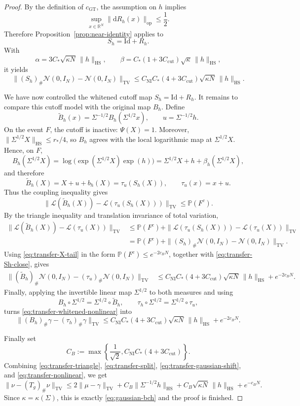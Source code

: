 \documentclass[10pt,a4paper]{amsart}
\newcommand{\HS}{\mathrm{HS}}
\newcommand{\Id}{\mathrm{Id}}
\newcommand{\Law}{\mathcal{L}}
\newcommand{\Prob}{\mathbb{P}}
\newcommand{\R}{\mathbb{R}}
\newcommand{\TV}{\mathrm{TV}}
\newcommand{\dd}{\mathrm{d}}
\newcommand{\op}{\mathrm{op}}
\begin{document}
\begin{proof}
By the definition of \(c_{\mathrm{GT}}\), the assumption on \(h\) implies
\[
\sup_{x\in\R^N}\|\dd R_h(x)\|_{\op}\le \frac12.
\]
Therefore Proposition~\ref{prop:near-identity} applies to
\[
S_h=\Id+R_h.
\]
With
\[
\alpha=3C_\ast\sqrt{\kappa N}\,\|h\|_{\HS},
\qquad
\beta=C_\ast(1+3C_{\mathrm{cut}})\sqrt{\kappa}\,\|h\|_{\HS},
\]
it yields
\begin{equation}
\label{eq:transfer-Sh-close}
\|(S_h)_\#\mathcal N(0,I_N)-\mathcal N(0,I_N)\|_{\TV}
\le
C_{\mathrm{NI}}C_\ast(4+3C_{\mathrm{cut}})
\sqrt{\kappa N}\,\|h\|_{\HS}.
\end{equation}


We have now controlled the whitened cutoff map \(S_h=\Id+R_h\). It remains to
compare this cutoff model with the original map \(B_h\). Define
\[
\widetilde B_h(x)=\Sigma^{-1/2}B_h(\Sigma^{1/2}x),
\qquad
u=\Sigma^{-1/2}h.
\]
On the event \(F\), the cutoff is inactive: \(\Psi(X)=1\). Moreover,
\(\|\Sigma^{1/2}X\|_{\HS}\le r_\ast/4\), so \(B_h\) agrees with the local
logarithmic map at \(\Sigma^{1/2}X\). Hence, on \(F\),
\[
B_h(\Sigma^{1/2}X)
=
\log\!\bigl(\exp(\Sigma^{1/2}X)\exp(h)\bigr)
=
\Sigma^{1/2}X+h+\beta_h(\Sigma^{1/2}X),
\]
and therefore
\[
\widetilde B_h(X)
=
X+u+b_h(X)
=
\tau_u(S_h(X)),
\qquad
\tau_u(x)=x+u.
\]
Thus the coupling inequality gives
\[
\|\Law(\widetilde B_h(X))-\Law(\tau_u(S_h(X)))\|_{\TV}
\le
\Prob(F^c).
\]
By the triangle inequality and translation invariance of total variation,
\begin{align*}
\|\Law(\widetilde B_h(X))-\Law(\tau_u(X))\|_{\TV}
&\le
\Prob(F^c)
+
\|\Law(\tau_u(S_h(X)))-\Law(\tau_u(X))\|_{\TV}\\
&=
\Prob(F^c)
+
\|(S_h)_\#\mathcal N(0,I_N)-\mathcal N(0,I_N)\|_{\TV}.
\end{align*}
Using \eqref{eq:transfer-X-tail} in the form
\(\Prob(F^c)\le e^{-2c_BN}\), together with
\eqref{eq:transfer-Sh-close}, gives
\begin{align}
\|(\widetilde B_h)_\#\mathcal N(0,I_N)
-(\tau_u)_\#\mathcal N(0,I_N)\|_{\TV}
&\le
C_{\mathrm{NI}}C_\ast(4+3C_{\mathrm{cut}})
\sqrt{\kappa N}\,\|h\|_{\HS}
+
e^{-2c_BN}.
\label{eq:transfer-whitened-nonlinear}
\end{align}
Finally, applying the invertible linear map \(\Sigma^{1/2}\) to both measures and
using
\[
B_h\circ \Sigma^{1/2}=\Sigma^{1/2}\circ \widetilde B_h,
\qquad
\tau_h\circ \Sigma^{1/2}=\Sigma^{1/2}\circ \tau_u,
\]
turns \eqref{eq:transfer-whitened-nonlinear} into
\begin{equation}
\label{eq:transfer-nonlinear}
\|(B_h)_\#\gamma-(\tau_h)_\#\gamma\|_{\TV}
\le
C_{\mathrm{NI}}C_\ast(4+3C_{\mathrm{cut}})
\sqrt{\kappa N}\,\|h\|_{\HS}
+
e^{-2c_BN}.
\end{equation}


Finally set
\[
C_B:=
\max\left\{
\frac1{\sqrt2},
C_{\mathrm{NI}}C_\ast(4+3C_{\mathrm{cut}})
\right\}.
\]
Combining \eqref{eq:transfer-triangle}, \eqref{eq:transfer-split},
\eqref{eq:transfer-gaussian-shift}, and \eqref{eq:transfer-nonlinear}, we get
\[
\|\nu-(T_g)_\#\nu\|_{\TV}
\le
2\|\mu-\gamma\|_{\TV}
+
C_B\|\Sigma^{-1/2}h\|_{\HS}
+
C_B\sqrt{\kappa N}\,\|h\|_{\HS}
+
e^{-c_BN}.
\]
Since \(\kappa=\kappa(\Sigma)\), this is exactly \eqref{eq:gaussian-bch} and the proof is finished.
\end{proof}
\end{document}
